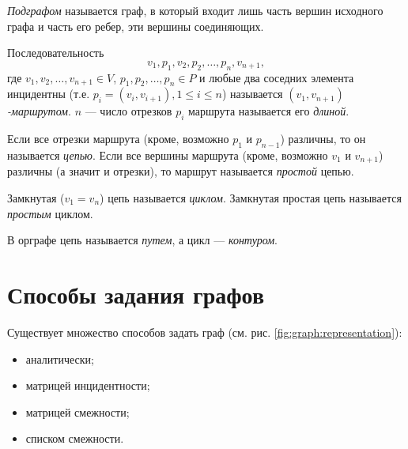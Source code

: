\emph{Подграфом} называется граф, в который входит лишь часть вершин исходного графа и часть его ребер, эти вершины соединяющих.

Последовательность 
\begin{equation}
    \label{eq:graph:path}
    v_1,p_1,v_2,p_2,\ldots,p_{n},v_{n+1},
\end{equation}
где $v_1,v_2,\ldots,v_{n+1}\in V$, $p_1,p_2,\ldots,p_{n}\in P$ и любые два соседних элемента инцидентны (т.е. $p_i=(v_i,v_{i+1}), 1\leq i\leq n$) называется \emph{$(v_1,v_{n+1})$-маршрутом}. $n$ --- число отрезков $p_i$ маршрута называется его \emph{длиной}.

Если все отрезки маршрута (кроме, возможно $p_1$ и $p_{n-1}$) различны, то он называется \emph{цепью}. Если все вершины маршрута (кроме, возможно $v_1$ и $v_{n+1}$) различны (а значит и отрезки), то маршрут называется \emph{простой} цепью.

Замкнутая ($v_1=v_n$) цепь называется \emph{циклом}. Замкнутая простая цепь называется \emph{простым} циклом.

В орграфе цепь называется \emph{путем}, а цикл --- \emph{контуром}.


\section{Способы задания графов}

Существует множество способов задать граф (см. рис. \ref{fig:graph:representation}):
\begin{itemize}
    \item аналитически;
    \item матрицей инцидентности;
    \item матрицей смежности;
    \item списком смежности.
\end{itemize}

